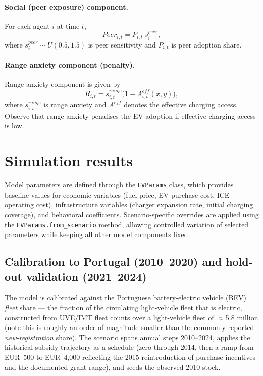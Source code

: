 \documentclass[11pt]{article}
\begin{document}
\paragraph{Social (peer exposure) component.} For each agent $i$ at time
$t$,
\begin{equation}
Peer_{i,t} = P_{i,t}\; s^{peer}_i ,
\end{equation}
where $s^{peer}_i \sim U(0.5, 1.5)$ is peer sensitivity and $P_{i,t}$ is
peer adoption share.

\paragraph{Range anxiety component (penalty).} Range anxiety component is
given by
\begin{equation}
R_{i,t} = s^{range}_{i,t}\big(1 - A^{e\!f\!f}_{i,t}(x,y)\big),
\end{equation}
where $s^{range}_{i,t}$ is range anxiety and $A^{e\!f\!f}$ denotes the
effective charging access. Observe that range anxiety penalises the EV
adoption if effective charging access is low.

\section{Simulation results}
\label{sec:results}

Model parameters are defined through the \texttt{EVParams} class, which
provides baseline values for economic variables (fuel price, EV purchase
cost, ICE operating cost), infrastructure variables (charger expansion rate,
initial charging coverage), and behavioral coefficients. Scenario-specific
overrides are applied using the \texttt{EVParams.from\_scenario} method,
allowing controlled variation of selected parameters while keeping all
other model components fixed.

\subsection{Calibration to Portugal (2010--2020) and hold-out validation
(2021--2024)}
\label{sec:calibration}

The model is calibrated against the Portuguese battery-electric vehicle
(BEV) \emph{fleet} share --- the fraction of the circulating light-vehicle
fleet that is electric, constructed from UVE/IMT fleet counts over a
light-vehicle fleet of $\approx$5.8 million (note this is roughly an order
of magnitude smaller than the commonly reported \emph{new-registration}
share). The scenario spans annual steps 2010--2024, applies the historical
subsidy trajectory as a schedule (zero through 2014, then a ramp from
EUR~500 to EUR~4{,}000 reflecting the 2015 reintroduction of purchase
incentives and the documented grant range), and seeds the observed 2010
stock.
\end{document}

